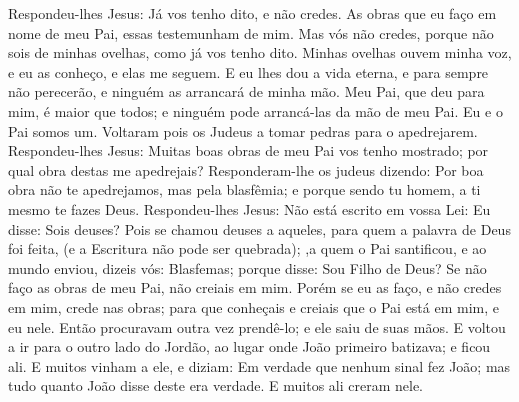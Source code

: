 {Respondeu-lhes Jesus: Já vos tenho dito, e não credes. As obras que eu faço em nome de meu Pai, essas testemunham de mim.
Mas vós não credes, porque não sois de minhas ovelhas, como já vos tenho dito.
Minhas ovelhas ouvem minha voz, e eu as conheço, e elas me seguem.
E eu lhes dou a vida eterna, e para sempre não perecerão, e ninguém as arrancará de minha mão.
Meu Pai, que
{} deu para mim, é maior que todos; e ninguém pode arrancá-las da mão de meu Pai.
Eu e o Pai somos um.
Voltaram pois os Judeus a tomar pedras para o apedrejarem.
Respondeu-lhes Jesus: Muitas boas obras de meu Pai vos tenho mostrado; por qual obra destas me apedrejais?
Responderam-lhe os judeus dizendo: Por boa obra não te apedrejamos, mas pela blasfêmia; e porque sendo tu homem, a ti mesmo te fazes Deus.
Respondeu-lhes Jesus: Não está escrito em vossa Lei: Eu disse: Sois deuses?
Pois se
{} chamou deuses a aqueles, para quem a palavra de Deus foi feita, (e a Escritura não pode ser quebrada);
 ,a quem o Pai santificou, e ao mundo enviou, dizeis vós: Blasfemas; porque disse: Sou Filho de Deus?
Se não faço as obras de meu Pai, não creiais em mim.
Porém se eu as faço, e não credes em mim, crede nas obras; para que conheçais e creiais que o Pai está em mim, e eu nele.
Então procuravam outra vez prendê-lo; e ele saiu de suas mãos.
E voltou a ir para o outro lado do Jordão, ao lugar onde João primeiro batizava; e ficou ali.
E muitos vinham a ele, e diziam: Em verdade que nenhum sinal fez João; mas tudo quanto João disse deste era verdade.
E muitos ali creram nele.

}
